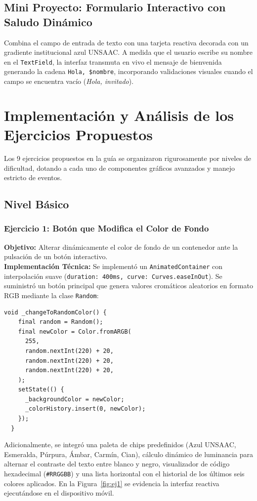 \documentclass[12pt,a4paper]{article}
\begin{document}
  \subsection{Mini Proyecto: Formulario Interactivo con Saludo Dinámico}
  Combina el campo de entrada de texto con una tarjeta reactiva decorada con un gradiente institucional azul UNSAAC. A medida que el usuario escribe su nombre en el \texttt{TextField}, la interfaz transmuta en vivo el mensaje de bienvenida generando la cadena \texttt{Hola, \$nombre}, incorporando validaciones visuales cuando el campo se encuentra vacío (\textit{Hola, invitado}).

  \section{Implementación y Análisis de los Ejercicios Propuestos}

  Los 9 ejercicios propuestos en la guía se organizaron rigurosamente por niveles de dificultad, dotando a cada uno de componentes gráficos avanzados y manejo estricto de eventos.

  \subsection{Nivel Básico}

  \subsubsection{Ejercicio 1: Botón que Modifica el Color de Fondo}
  \textbf{Objetivo:} Alterar dinámicamente el color de fondo de un contenedor ante la pulsación de un botón interactivo.\\
  \textbf{Implementación Técnica:}
  Se implementó un \texttt{AnimatedContainer} con interpolación suave (\texttt{duration: 400ms, curve: Curves.easeInOut}). Se suministró un botón principal que genera valores cromáticos aleatorios en formato RGB mediante la clase \texttt{Random}:
  \begin{lstlisting}[caption={Generación de color aleatorio y mutación de estado}]
  void _changeToRandomColor() {
    final random = Random();
    final newColor = Color.fromARGB(
      255,
      random.nextInt(220) + 20,
      random.nextInt(220) + 20,
      random.nextInt(220) + 20,
    );
    setState(() {
      _backgroundColor = newColor;
      _colorHistory.insert(0, newColor);
    });
  }
  \end{lstlisting}
  Adicionalmente, se integró una paleta de chips predefinidos (Azul UNSAAC, Esmeralda, Púrpura, Ámbar, Carmín, Cian), cálculo dinámico de luminancia para alternar el contraste del texto entre blanco y negro, visualizador de código hexadecimal (\texttt{\#RRGGBB}) y una lista horizontal con el historial de los últimos seis colores aplicados. En la Figura~\ref{fig:ej1} se evidencia la interfaz reactiva ejecutándose en el dispositivo móvil.
\end{document}
